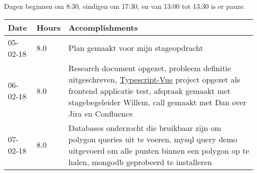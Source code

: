 Dagen beginnen om 8:30, eindigen om 17:30, en van 13:00 tot 13:30 is er pauze.
\begin{center}
    \begin{tabular}{ | l | l | p{9cm} |}
    \hline

    Date & Hours & Accomplishments \\ \hline
    05-02-18 & 8.0 & Plan gemaakt voor mijn stageopdracht \\ \hline
    06-02-18 & 8.0 & Research document opgezet, probleem definitie uitgeschreven, \href{https://github.com/Menziess/Typescript-Vue-Template}{Typescript-Vue} project opgezet als frontend applicatie test, afspraak gemaakt met stagebegeleider Willem, call gemaakt met Dan over Jira en Confluence \\ \hline
    07-02-18 & 8.0 & Databases onderzocht die bruikbaar zijn om polygon queries uit te voeren, mysql query demo uitgevoerd om alle punten binnen een polygon op te halen, mongodb geprobeerd te installeren \\ \hline

    \hline
    \end{tabular}
\end{center}